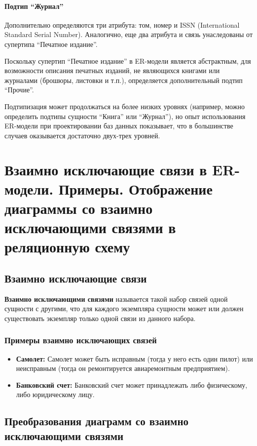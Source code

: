 \documentclass[a4paper,12pt]{article}
\begin{document}
\paragraph{Подтип ``Журнал''} Дополнительно определяются три атрибута: том, номер и ISSN (International Standard Serial Number). Аналогично, еще два атрибута и связь унаследованы от супертипа ``Печатное издание''.

Поскольку супертип ``Печатное издание'' в ER-модели является абстрактным, для возможности описания печатных изданий, не являющихся книгами или журналами (брошюры, листовки и т.п.), определяется дополнительный подтип ``Прочие''.

Подтипизация может продолжаться на более низких уровнях (например, можно определить подтипы сущности ``Книга'' или ``Журнал''), но опыт использования ER-модели при проектировании баз данных показывает, что в большинстве случаев оказывается достаточно двух-трех уровней.

\section{Взаимно исключающие связи в ER-модели. Примеры. Отображение диаграммы со взаимно исключающими связями в реляционную схему}

\subsection{Взаимно исключающие связи}

\textbf{Взаимно исключающими связями} называется такой набор связей одной сущности с другими, что для каждого экземпляра сущности может или должен существовать экземпляр только одной связи из данного набора.

\subsubsection{Примеры взаимно исключающих связей}

\begin{itemize}
    \item \textbf{Самолет:} Самолет может быть исправным (тогда у него есть один пилот) или неисправным (тогда он ремонтируется авиаремонтным предприятием).
    \item \textbf{Банковский счет:} Банковский счет может принадлежать либо физическому, либо юридическому лицу.
\end{itemize}

\subsection{Преобразования диаграмм со взаимно исключающими связями}
\end{document}
